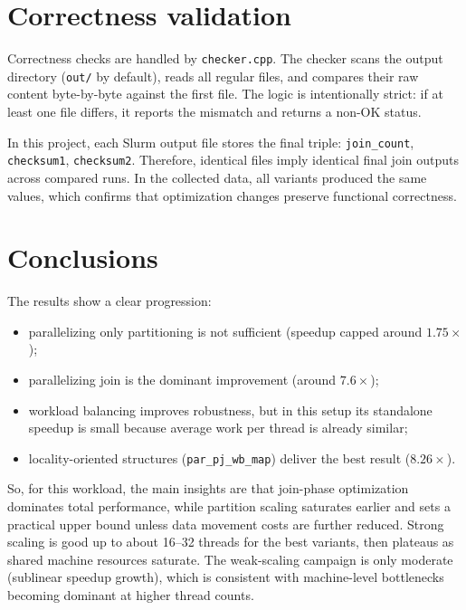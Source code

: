 \documentclass[11pt,a4paper]{article}
\begin{document}
\section{Correctness validation}
Correctness checks are handled by \texttt{checker.cpp}. The checker scans the output directory (\texttt{out/} by default), reads all regular files, and compares their raw content byte-by-byte against the first file.
The logic is intentionally strict: if at least one file differs, it reports the mismatch and returns a non-OK status.

In this project, each Slurm output file stores the final triple: \texttt{join\_count}, \texttt{checksum1}, \texttt{checksum2}.
Therefore, identical files imply identical final join outputs across compared runs. In the collected data, all variants produced the same values, which confirms that optimization changes preserve functional correctness.


\section{Conclusions}
The results show a clear progression:
\begin{itemize}
    \item parallelizing only partitioning is not sufficient (speedup capped around \(1.75\times\));
    \item parallelizing join is the dominant improvement (around \(7.6\times\));
    \item workload balancing improves robustness, but in this setup its standalone speedup is small because average work per thread is already similar;
    \item locality-oriented structures (\texttt{par\_pj\_wb\_map}) deliver the best result (\(8.26\times\)).
\end{itemize}

So, for this workload, the main insights are that join-phase optimization dominates total performance, while partition scaling saturates earlier and sets a practical upper bound unless data movement costs are further reduced. Strong scaling is good up to about 16--32 threads for the best variants, then plateaus as shared machine resources saturate. The weak-scaling campaign is only moderate (sublinear speedup growth), which is consistent with machine-level bottlenecks becoming dominant at higher thread counts.
\end{document}
